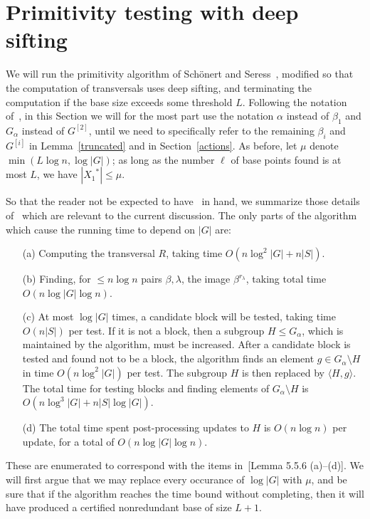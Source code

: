 \documentclass[12pt]{article}
\begin{document}
\section{Primitivity testing with deep sifting}\label{primitivity}
We will run the primitivity algorithm of
Sch\"onert and Seress~\cite{SchonertSeress1994,seress-book},
modified so that the computation of
transversals uses deep sifting, and terminating
the computation if the base size exceeds some threshold $L$.
Following the notation of~\cite[Section 5.5]{seress-book},
in this Section we will for the most part
use the notation $\alpha$ instead of $\beta_1$
and $G_\alpha$ instead of  $G^{[2]}$, until we need to specifically
refer to the remaining $\beta_i$ and  $G^{[i]}$ in Lemma~\ref{truncated} and
in Section~\ref{actions}.
As before, let $\mu$ denote $\min(L\log n,\log|G|)$;
as long as the number $\ell$ of base points found is
at most $L$, we have $|{X_1}^*|\leq\mu$.

So that the reader not be expected to have~\cite{seress-book} in hand,
we summarize those details of~\cite[Section 5.5]{seress-book} which are
relevant to the current discussion.  
The only parts of the algorithm which
cause the running time to depend on $|G|$ are:
\begin{itemize}
  \item[(a)] Computing the transversal $R$, taking time $O(n\log^2|G|+n|S|)$.
  \item[(b)] Finding, for $\leq n\log n$ pairs $\beta,\lambda$, the image
  $\beta^{r_\lambda}$, taking total time $O(n\log|G|\log n)$.
  \item[(c)] At most $\log|G|$ times, 
    a candidate block will be tested, taking time $O(n|S|)$ per test.
    If it is not a block, then a 
    subgroup $H\leq G_\alpha$, which
    is maintained by the algorithm, must be increased.
    After a candidate
    block is tested and found not to be a block, the algorithm
    finds an element $g\in G_\alpha\setminus H$
    in time $O(n\log^2|G|)$ per test.  The subgroup
    $H$ is then replaced by $\langle H,g\rangle$.
    The total time for testing blocks and finding
    elements of $G_\alpha\setminus H$ is $O(n\log^3|G|+n|S|\log|G|)$.  
 \item[(d)] The total time spent post-processing updates to
   $H$ is $O(n\log n)$ per update, for a total of $O(n\log|G|\log n)$.
\end{itemize}
These are enumerated to correspond with the items
in~\cite{seress-book}[Lemma 5.5.6 (a)--(d)].  We will first argue
that we may replace every occurance of $\log|G|$ with
$\mu$, and be sure that if the algorithm reaches the
time bound without completing, then it will have
produced a certified nonredundant base of size $L+1$.
\end{document}
